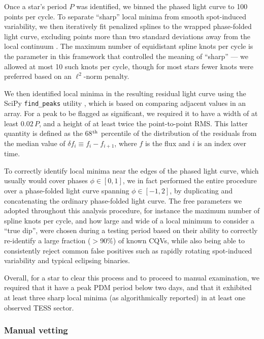 \documentclass[11pt,twocolumn,tighten]{aastex63}
\begin{document}
Once a star's period $P$ was identified, we binned the phased light
curve to 100 points per cycle.  To separate ``sharp'' local minima
from smooth spot-induced variability, we then iteratively fit
penalized splines to the wrapped phase-folded light curve, excluding
points more than two standard deviations away from the local continuum
\citep{2019AJ....158..143H}.  The maximum number of equidistant spline
knots per cycle is the parameter in this framework that controlled the
meaning of ``sharp'' --- we allowed at most 10 such knots per cycle,
though for most stars fewer knots were preferred based on an
$\ell^2$-norm penalty. 

We then identified local minima in the resulting residual light curve
using the SciPy \texttt{find\_peaks} utility
\citep{2020NatMe..17..261V}, which is based on comparing adjacent
values in an array.  For a peak to be flagged as significant, we
required it to have a width of at least $0.02\,P$, and a height of at
least twice the point-to-point RMS.  This latter quantity is defined
as the 68$^{\rm th}$ percentile of the distribution of the residuals
from the median value of $\delta f_i \equiv f_i - f_{i+1}$, where $f$
is the flux and $i$ is an index over time.

To correctly identify local minima near the edges of the phased light
curve, which usually would cover phases $\phi \in [ 0,1 ]$, we in fact
performed the entire procedure over a phase-folded light curve
spanning $\phi \in [-1,2 ]$, by duplicating and concatenating the
ordinary phase-folded light curve.  The free parameters we adopted
throughout this analysis procedure, for instance the maximum number of
spline knots per cycle, and how large and wide of a local minimum to
consider a ``true dip'', were chosen during a testing period based on
their ability to correctly re-identify a large fraction ($>$90\%) of
known CQVs, while also being able to consistently reject common false
positives such as rapidly rotating spot-induced variability and
typical eclipsing binaries.

Overall, for a star to clear this process and to proceed to manual
examination, we required that it have a peak PDM period below two
days, and that it exhibited at least three sharp local minima (as
algorithmically reported) in at least one observed TESS sector.


\subsubsection{Manual vetting}
\end{document}
